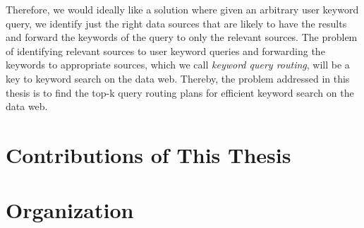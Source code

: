 Therefore, we would ideally like a solution where given an arbitrary user keyword query, we identify
just the right data sources that are likely to have the results and forward the keywords of the query
to only the relevant sources. The problem of identifying relevant sources to user keyword queries and
forwarding the keywords to appropriate sources, which we call {\em keyword query routing}, will be a
key to keyword search on the data web. Thereby, the problem addressed in this thesis is to find the
top-k query routing plans for efficient keyword search on the data web.

\section{Contributions of This Thesis}\label{intro:contribution}


\section{Organization}\label{intro:organization}

